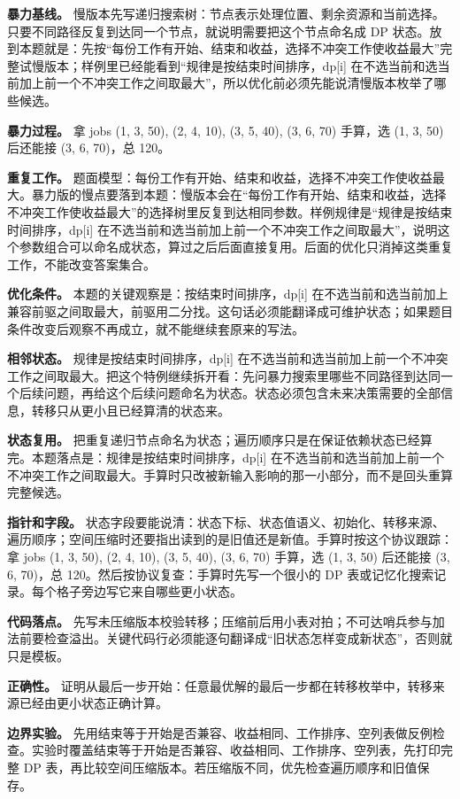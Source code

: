 \textbf{暴力基线。} 慢版本先写递归搜索树：节点表示处理位置、剩余资源和当前选择。只要不同路径反复到达同一个节点，就说明需要把这个节点命名成 DP 状态。放到本题就是：先按“每份工作有开始、结束和收益，选择不冲突工作使收益最大”完整试慢版本；样例里已经能看到“规律是按结束时间排序，dp[i] 在不选当前和选当前加上前一个不冲突工作之间取最大”，所以优化前必须先能说清慢版本枚举了哪些候选。

\textbf{暴力过程。} 拿 jobs (1, 3, 50), (2, 4, 10), (3, 5, 40), (3, 6, 70) 手算，选 (1, 3, 50) 后还能接 (3, 6, 70)，总 120。

\textbf{重复工作。} 题面模型：每份工作有开始、结束和收益，选择不冲突工作使收益最大。暴力版的慢点要落到本题：慢版本会在“每份工作有开始、结束和收益，选择不冲突工作使收益最大”的选择树里反复到达相同参数。样例规律是“规律是按结束时间排序，dp[i] 在不选当前和选当前加上前一个不冲突工作之间取最大”，说明这个参数组合可以命名成状态，算过之后后面直接复用。后面的优化只消掉这类重复工作，不能改变答案集合。

\textbf{优化条件。} 本题的关键观察是：按结束时间排序，dp[i] 在不选当前和选当前加上兼容前驱之间取最大，前驱用二分找。这句话必须能翻译成可维护状态；如果题目条件改变后观察不再成立，就不能继续套原来的写法。

\textbf{相邻状态。} 规律是按结束时间排序，dp[i] 在不选当前和选当前加上前一个不冲突工作之间取最大。把这个特例继续拆开看：先问暴力搜索里哪些不同路径到达同一个后续问题，再给这个后续问题命名为状态。状态必须包含未来决策需要的全部信息，转移只从更小且已经算清的状态来。

\textbf{状态复用。} 把重复递归节点命名为状态；遍历顺序只是在保证依赖状态已经算完。本题落点是：规律是按结束时间排序，dp[i] 在不选当前和选当前加上前一个不冲突工作之间取最大。手算时只改被新输入影响的那一小部分，而不是回头重算完整候选。

\textbf{指针和字段。} 状态字段要能说清：状态下标、状态值语义、初始化、转移来源、遍历顺序；空间压缩时还要指出读到的是旧值还是新值。手算时按这个协议跟踪：拿 jobs (1, 3, 50), (2, 4, 10), (3, 5, 40), (3, 6, 70) 手算，选 (1, 3, 50) 后还能接 (3, 6, 70)，总 120。然后按协议复查：手算时先写一个很小的 DP 表或记忆化搜索记录。每个格子旁边写它来自哪些更小状态。

\textbf{代码落点。} 先写未压缩版本校验转移；压缩前后用小表对拍；不可达哨兵参与加法前要检查溢出。关键代码行必须能逐句翻译成“旧状态怎样变成新状态”，否则就只是模板。

\textbf{正确性。} 证明从最后一步开始：任意最优解的最后一步都在转移枚举中，转移来源已经由更小状态正确计算。

\textbf{边界实验。} 先用结束等于开始是否兼容、收益相同、工作排序、空列表做反例检查。实验时覆盖结束等于开始是否兼容、收益相同、工作排序、空列表，先打印完整 DP 表，再比较空间压缩版本。若压缩版不同，优先检查遍历顺序和旧值保存。

